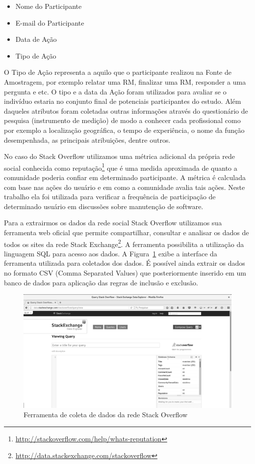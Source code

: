 \begin{itemize}
	\item Nome do Participante
	\item E-mail do Participante
	\item Data de Ação
	\item Tipo de Ação
\end{itemize}

O Tipo de Ação representa a aquilo que o participante realizou na Fonte de
Amostragem, por exemplo relatar uma RM, finalizar uma RM, responder a uma
pergunta e etc. O tipo e a data da Ação foram utilizados para avaliar se o
indivíduo estaria no conjunto final de potenciais participantes do estudo. Além
daqueles atributos foram coletadas outras informações através do questionário de
pesquisa (instrumento de medição) de modo a conhecer cada profissional como por
exemplo a localização geográfica, o tempo de experiência, o nome da função
desempenhada, as principais atribuições, dentre outros.


No caso do Stack Overflow utilizamos uma métrica adicional da própria rede
social conhecida como
reputação\footnote{\url{http://stackoverflow.com/help/whats-reputation}} que é
uma medida aproximada de quanto a comunidade poderia confiar em determinado
participante. A métrica é calculada com base nas ações do usuário e em como a
comunidade avalia tais ações. Neste trabalho ela foi utilizada para verificar
a frequência de participação de determinado usuário em discussões sobre
manutenção de software.

Para a extrairmos os dados da rede social Stack Overflow utilizamos sua
ferramenta web oficial que permite compartilhar, consultar e analisar os dados
de todos os sites da rede Stack
Exchange\footnote{\url{http://data.stackexchange.com/stackoverflow}}. A
ferramenta possibilita a utilização da linguagem SQL para acesso aos dados. A
Figura~\ref{fig:stack-exchange} exibe a interface da ferramenta utilizada para
coletados dos dados. É possível ainda extrair os dados no formato CSV (Comma
Separated Values) que posteriormente inserido em um banco de dados para
aplicação das regras de inclusão e exclusão.

\begin{figure}[htpb]
	\centering
	\includegraphics[width=0.8\linewidth]{./chapter-pesquisa-com-profissionais/img/stack-exchange.png}
	\caption{Ferramenta de coleta de dados da rede Stack Overflow}
\label{fig:stack-exchange}
\end{figure}

